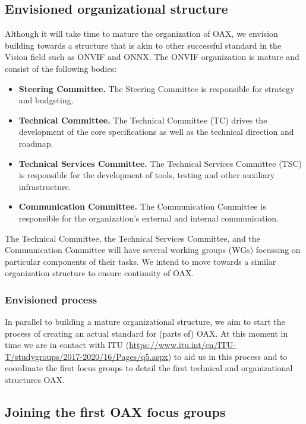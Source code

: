 \documentclass{article}
\begin{document}
\subsection{Envisioned organizational structure}

Although it will take time to mature the organization of OAX, we envision building towards a structure that is akin to other successful standard in the Vision field such as ONVIF and ONNX. The ONVIF organization is mature and consist of the following bodies:

\begin{itemize}
\item \textbf{Steering Committee.} The Steering Committee is responsible for strategy and budgeting.
\item \textbf{Technical Committee.} The Technical Committee (TC) drives the development of the core specifications as well as the technical direction and roadmap. 
\item \textbf{Technical Services Committee.} The Technical Services Committee (TSC) is responsible for the development of tools, testing and other auxiliary infrastructure.
\item \textbf{Communication Committee.} The Communication Committee is responsible for the organization’s external and internal communication.
\end{itemize}

The Technical Committee, the Technical Services Committee, and the Communication Committee will have several working groups (WGs) focussing on particular components of their tasks. We intend to move towards a similar organization structure to ensure continuity of OAX.

\subsubsection{Envisioned process}

In parallel to building a mature organizational structure, we aim to start the process of creating an actual standard for (parts of) OAX. At this moment in time we are in contact with ITU (\href{https://www.itu.int/en/ITU-T/studygroups/2017-2020/16/Pages/q5.aspx}{https://www.itu.int/en/ITU-T/studygroups/2017-2020/16/Pages/q5.aspx}) to aid us in this process and to coordinate the first focus groups to detail the first technical and organizational structures OAX.

\subsection{Joining the first OAX  focus groups}
\end{document}
